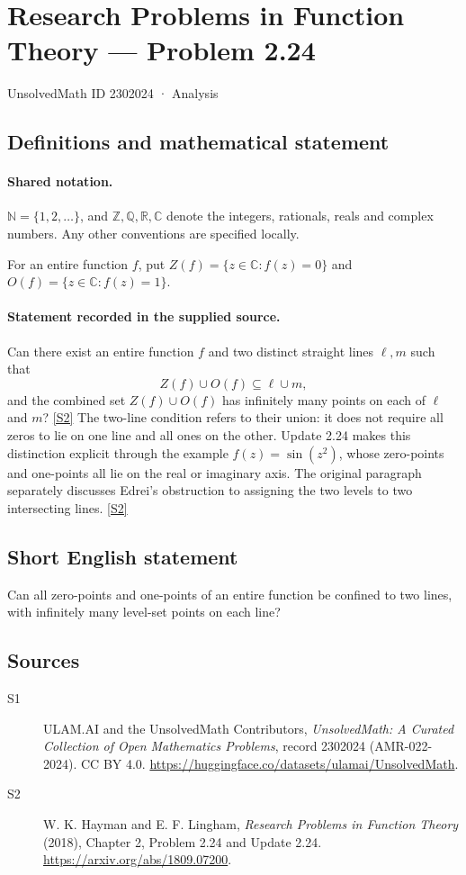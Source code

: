 \documentclass[11pt]{article}
\newcommand{\sref}[2]{\hyperlink{source:#1:#2}{[S#2]}}
\begin{document}
\setcounter{section}{2302023}
\section{Research Problems in Function Theory — Problem 2.24}\label{2302024}
{\small\sffamily UnsolvedMath ID 2302024 · Analysis}
\subsection{Definitions and mathematical statement}

\paragraph{Shared notation.}$\mathbb N=\{1,2,\ldots\}$, and $\mathbb Z,\mathbb Q,\mathbb R,\mathbb C$ denote the integers, rationals, reals and complex numbers. Any other conventions are specified locally.


For an entire function $f$, put $Z(f)=\{z\in\mathbb C:f(z)=0\}$ and $O(f)=\{z\in\mathbb C:f(z)=1\}$.

\paragraph{Statement recorded in the supplied source.}
Can there exist an entire function $f$ and two distinct straight lines $\ell,m$ such that
\[Z(f)\cup O(f)\subseteq\ell\cup m,\]
and the combined set $Z(f)\cup O(f)$ has infinitely many points on each of $\ell$ and $m$? \sref{2302024}{2}
The two-line condition refers to their union: it does not require all zeros to lie on one line and all ones on the other. Update 2.24 makes this distinction explicit through the example $f(z)=\sin(z^2)$, whose zero-points and one-points all lie on the real or imaginary axis. The original paragraph separately discusses Edrei's obstruction to assigning the two levels to two intersecting lines. \sref{2302024}{2}
\subsection{Short English statement}
Can all zero-points and one-points of an entire function be confined to two lines, with infinitely many level-set points on each line?
\subsection{Sources}
\begin{description}
\item[\hypertarget{source:2302024:1}{S1}] ULAM.AI and the UnsolvedMath Contributors, \emph{UnsolvedMath: A Curated Collection of Open Mathematics Problems}, record 2302024 (AMR-022-2024). CC BY 4.0. \url{https://huggingface.co/datasets/ulamai/UnsolvedMath}.
\item[\hypertarget{source:2302024:2}{S2}] W. K. Hayman and E. F. Lingham, \emph{Research Problems in Function Theory} (2018), Chapter 2, Problem 2.24 and Update 2.24. \url{https://arxiv.org/abs/1809.07200}.
\end{description}
\label{end:2302024}
\end{document}
